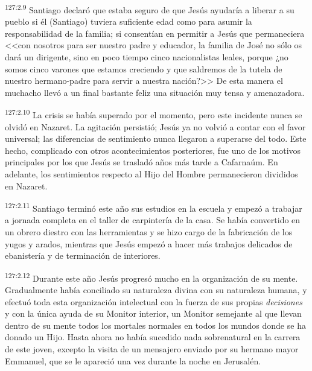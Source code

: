 \par 
\textsuperscript{127:2.9} Santiago declaró que estaba seguro de que Jesús ayudaría a liberar a su pueblo si él (Santiago) tuviera suficiente edad como para asumir la responsabilidad de la familia; si consentían en permitir a Jesús que permaneciera <<con nosotros para ser nuestro padre y educador, la familia de José no sólo os dará un dirigente, sino en poco tiempo cinco nacionalistas leales, porque ¿no somos cinco varones que estamos creciendo y que saldremos de la tutela de nuestro hermano-padre para servir a nuestra nación?>> De esta manera el muchacho llevó a un final bastante feliz una situación muy tensa y amenazadora.

\par 
\textsuperscript{127:2.10} La crisis se había superado por el momento, pero este incidente nunca se olvidó en Nazaret. La agitación persistió; Jesús ya no volvió a contar con el favor universal; las diferencias de sentimiento nunca llegaron a superarse del todo. Este hecho, complicado con otros acontecimientos posteriores, fue uno de los motivos principales por los que Jesús se trasladó años más tarde a Cafarnaúm. En adelante, los sentimientos respecto al Hijo del Hombre permanecieron divididos en Nazaret.

\par 
\textsuperscript{127:2.11} Santiago terminó este año sus estudios en la escuela y empezó a trabajar a jornada completa en el taller de carpintería de la casa. Se había convertido en un obrero diestro con las herramientas y se hizo cargo de la fabricación de los yugos y arados, mientras que Jesús empezó a hacer más trabajos delicados de ebanistería y de terminación de interiores.

\par 
\textsuperscript{127:2.12} Durante este año Jesús progresó mucho en la organización de su mente. Gradualmente había conciliado su naturaleza divina con su naturaleza humana, y efectuó toda esta organización intelectual con la fuerza de sus propias \textit{decisiones} y con la única ayuda de su Monitor interior, un Monitor semejante al que llevan dentro de su mente todos los mortales normales en todos los mundos donde se ha donado un Hijo. Hasta ahora no había sucedido nada sobrenatural en la carrera de este joven, excepto la visita de un mensajero enviado por su hermano mayor Emmanuel, que se le apareció una vez durante la noche en Jerusalén.

